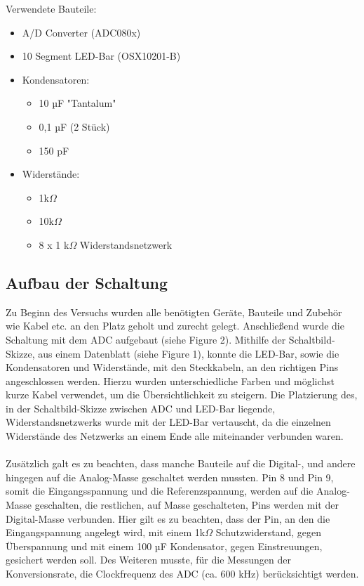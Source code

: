 \documentclass[a4paper,12pt]{article}
\begin{document}
\noindent Verwendete Bauteile:
\begin{itemize}
\item A/D Converter (ADC080x)
\item 10 Segment LED-Bar (OSX10201-B)
\newpage
\item Kondensatoren: 
	\begin{itemize}
	\item 10 µF "Tantalum"
	\item 0,1 µF (2 Stück)
	\item 150 pF
	\end{itemize}
\item Widerstände: 
	\begin{itemize}
	\item 1k$\Omega$
	\item 10k$\Omega$
	\item 8 x 1 k$\Omega$ Widerstandsnetzwerk
	\end{itemize}
\end{itemize}

\subsection{Aufbau der Schaltung}
Zu Beginn des Versuchs wurden alle benötigten Geräte, Bauteile und Zubehör wie Kabel etc. an den Platz geholt und zurecht gelegt. Anschließend wurde die Schaltung mit dem ADC aufgebaut (siehe Figure 2). Mithilfe der Schaltbild-Skizze, aus einem Datenblatt (siehe Figure 1), konnte die LED-Bar, sowie die Kondensatoren und Widerstände, mit den Steckkabeln, an den richtigen Pins angeschlossen werden. Hierzu wurden unterschiedliche Farben und möglichst kurze Kabel verwendet, um die Übersichtlichkeit zu steigern. Die Platzierung des, in der Schaltbild-Skizze zwischen ADC und LED-Bar liegende, Widerstandsnetzwerks wurde mit der LED-Bar vertauscht, da die einzelnen Widerstände des Netzwerks an einem Ende alle miteinander verbunden waren.\\\\Zusätzlich galt es zu beachten, dass manche Bauteile auf die Digital-, und andere hingegen auf die Analog-Masse geschaltet werden mussten. Pin 8 und Pin 9, somit die Eingangsspannung und die Referenzspannung, werden auf die Analog-Masse geschalten, die restlichen, auf Masse geschalteten, Pins werden mit der Digital-Masse verbunden. Hier gilt es zu beachten, dass der Pin, an den die Eingangspannung angelegt wird, mit einem 1k$\Omega$ Schutzwiderstand, gegen Überspannung und mit einem 100 µF Kondensator, gegen Einstreuungen, gesichert werden soll.
Des Weiteren musste, für die Messungen der Konversionsrate, die Clockfrequenz des ADC (ca. 600 kHz) berücksichtigt werden.
\end{document}
